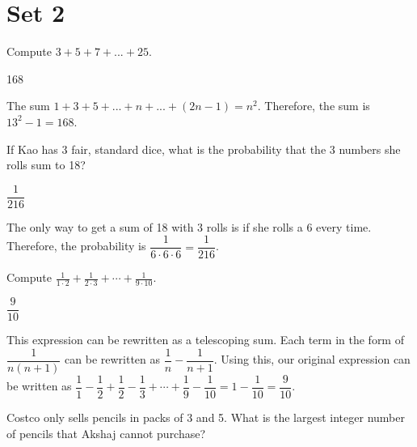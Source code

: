 \documentclass[11pt]{article}
\begin{document}
\newpage

\section*{Set 2}

\begin{problem}%
Compute $3+5+7+...+25$.
\end{problem}

\begin{answer}
168
\end{answer}

\begin{solution}
The sum $1+3+5+...+n+...+(2n-1) = n^2$. Therefore, the sum is $13^2-1 = 168$.  
\end{solution}


\begin{problem}%
If Kao has 3 fair, standard dice, what is the probability that the 3 numbers she rolls sum to 18?
\end{problem}

\begin{answer}
$\dfrac{1}{216}$
\end{answer}

\begin{solution}
The only way to get a sum of 18 with 3 rolls is if she rolls a 6 every time. Therefore, the probability is $\dfrac{1}{6\cdot6\cdot6} = \dfrac{1}{216}$.
\end{solution}

\begin{problem}%
Compute $\frac{1}{1\cdot 2} + \frac{1}{2\cdot 3} + \cdots + \frac{1}{9\cdot 10}$.
\end{problem}

\begin{answer}
$\dfrac{9}{10}$
\end{answer}

\begin{solution}
This expression can be rewritten as a telescoping sum. Each term in the form of $\dfrac{1}{n(n+1)}$ can be rewritten as $\dfrac{1}{n} - \dfrac{1}{n+1}$. Using this, our original expression can be written as $\dfrac{1}{1} - \dfrac{1}{2} + \dfrac{1}{2} - \dfrac{1}{3} + \cdots + \dfrac{1}{9} - \dfrac{1}{10} = 1 - \dfrac{1}{10} = \dfrac{9}{10}$.
\end{solution}

\begin{problem}
Costco only sells pencils in packs of 3 and 5. What is the largest integer number of pencils that Akshaj cannot purchase?
\end{problem}
\end{document}
